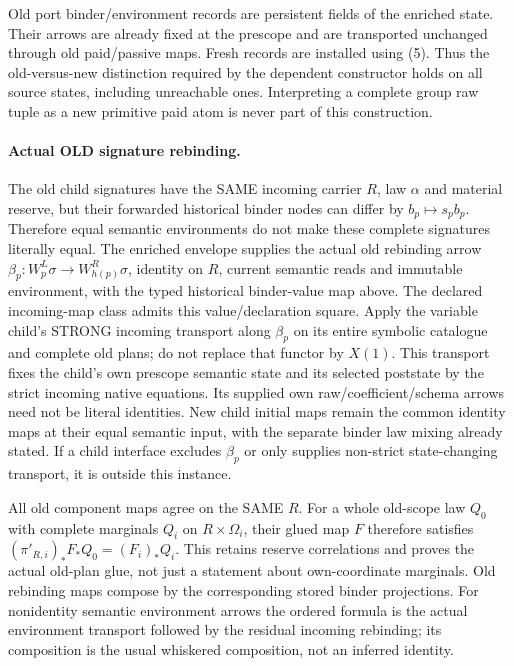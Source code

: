 \documentclass[11pt]{article}
\begin{document}
Old port binder/environment records are persistent fields of the enriched state. Their arrows are already fixed at the prescope and are transported unchanged through old paid/passive maps. Fresh records are installed using (5). Thus the old-versus-new distinction required by the dependent constructor holds on all source states, including unreachable ones. Interpreting a complete group raw tuple as a new primitive paid atom is never part of this construction.

\paragraph{Actual OLD signature rebinding.}
The old child signatures have the SAME incoming carrier $R$, law $\alpha$ and material reserve, but their forwarded historical binder nodes can differ by $b_p\mapsto s_pb_p$. Therefore equal semantic environments do not make these complete signatures literally equal. The enriched envelope supplies the actual old rebinding arrow $\beta_p:W^L_p\sigma\to W^R_{h(p)}\sigma$, identity on $R$, current semantic reads and immutable environment, with the typed historical binder-value map above. The declared incoming-map class admits this value/declaration square. Apply the variable child's STRONG incoming transport along $\beta_p$ on its entire symbolic catalogue and complete old plans; do not replace that functor by $X(1)$. This transport fixes the child's own prescope semantic state and its selected poststate by the strict incoming native equations. Its supplied own raw/coefficient/schema arrows need not be literal identities. New child initial maps remain the common identity maps at their equal semantic input, with the separate binder law mixing already stated. If a child interface excludes $\beta_p$ or only supplies non-strict state-changing transport, it is outside this instance.

All old component maps agree on the SAME $R$. For a whole old-scope law $Q_0$ with complete marginals $Q_i$ on $R\times\Omega_i$, their glued map $F$ therefore satisfies $(\pi'_{R,i})_*F_*Q_0=(F_i)_*Q_i$. This retains reserve correlations and proves the actual old-plan glue, not just a statement about own-coordinate marginals. Old rebinding maps compose by the corresponding stored binder projections. For nonidentity semantic environment arrows the ordered formula is the actual environment transport followed by the residual incoming rebinding; its composition is the usual whiskered composition, not an inferred identity.
\end{document}
